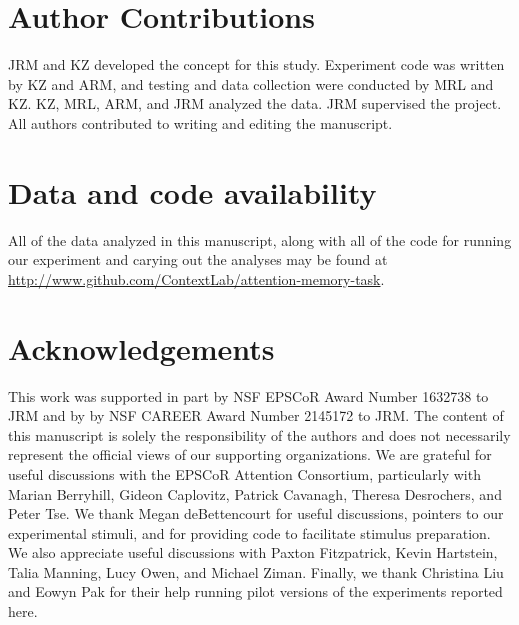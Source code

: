 \documentclass[english]{article}
\begin{document}
\section*{Author Contributions}

JRM and KZ developed the concept for this study. Experiment code was written by
KZ and ARM, and testing and data collection were conducted by MRL and KZ. KZ,
MRL, ARM, and JRM analyzed the data. JRM supervised the project. All authors
contributed to writing and editing the manuscript.

\section*{Data and code availability}

All of the data analyzed in this manuscript, along with all of the code for
running our experiment and carying out the analyses may be found at
\url{http://www.github.com/ContextLab/attention-memory-task}.


\section*{Acknowledgements}

This work was supported in part by NSF EPSCoR Award Number 1632738 to JRM and
by by NSF CAREER Award Number 2145172 to JRM. The content of this manuscript is
solely the responsibility of the authors and does not necessarily represent the
official views of our supporting organizations. We are grateful for useful
discussions with the EPSCoR Attention Consortium, particularly with Marian
Berryhill, Gideon Caplovitz, Patrick Cavanagh, Theresa Desrochers, and Peter
Tse. We thank Megan deBettencourt for useful discussions, pointers to our
experimental stimuli, and for providing code to facilitate stimulus
preparation. We also appreciate useful discussions with Paxton Fitzpatrick,
Kevin Hartstein, Talia Manning, Lucy Owen, and Michael Ziman. Finally, we thank
Christina Liu and Eowyn Pak for their help running pilot versions of the
experiments reported here.




\end{document}
